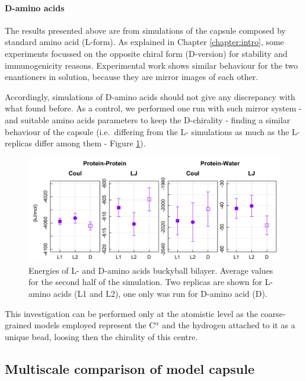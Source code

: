 \paragraph{D-amino acids} The results presented above are from simulations of the capsule composed by standard amino acid (L-form). As explained in Chapter \ref{chapter:intro}, some experiments focussed on the opposite chiral form (D-version) for stability and immunogenicity reasons. Experimental work shows similar behaviour for the two enantioners in solution, because they are mirror images of each other.

Accordingly, simulations of D-amino acids should not give any discrepancy with what found before. As a control, we performed one run with such mirror system - and suitable amino acids parameters to keep the D-chirality - finding a similar behaviour of the capsule (i.e.\ differing from the L- simulations as much as the L- replicas differ among them - Figure \ref{fig:D_aa}).

\begin{figure}[t]
\centering
\includegraphics[width=0.95\linewidth]{3results_capsule/pics/compare_D_L.png}
\caption[Energies of L- and D-amino acids buckyball bilayer (atomistic)]{Energies of L- and D-amino acids buckyball bilayer. Average values for the second half of the simulation. Two replicas are shown for L-amino acids (L1 and L2), one only was run for D-amino acid (D).}
\label{fig:D_aa}
\end{figure}

This investigation can be performed only at the atomistic level as the coarse-grained models employed represent the C$^\alpha$ and the hydrogen attached to it as a unique bead, loosing then the chirality of this centre.


\subsection{Multiscale comparison of model capsule} \label{sec:res_multiscale}

